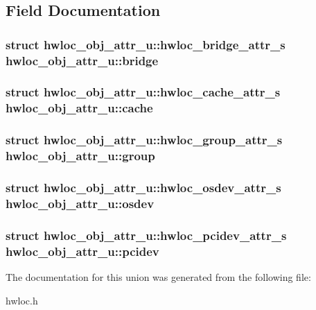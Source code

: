 \subsection{Field Documentation}
\hypertarget{a00017_adbdf280699dd84c7619cd8d9edc0d958}{
\subsubsection[{bridge}]{\setlength{\rightskip}{0pt plus 5cm}struct {\bf hwloc\_\-obj\_\-attr\_\-u::hwloc\_\-bridge\_\-attr\_\-s}  {\bf hwloc\_\-obj\_\-attr\_\-u::bridge}}}
\label{a00017_adbdf280699dd84c7619cd8d9edc0d958}
\hypertarget{a00017_ab5a8ae3bf490e6b1071fea53f7382836}{
\subsubsection[{cache}]{\setlength{\rightskip}{0pt plus 5cm}struct {\bf hwloc\_\-obj\_\-attr\_\-u::hwloc\_\-cache\_\-attr\_\-s}  {\bf hwloc\_\-obj\_\-attr\_\-u::cache}}}
\label{a00017_ab5a8ae3bf490e6b1071fea53f7382836}
\hypertarget{a00017_ae4ba157cc313e2cdd9a82f1c1df7aaa6}{
\subsubsection[{group}]{\setlength{\rightskip}{0pt plus 5cm}struct {\bf hwloc\_\-obj\_\-attr\_\-u::hwloc\_\-group\_\-attr\_\-s}  {\bf hwloc\_\-obj\_\-attr\_\-u::group}}}
\label{a00017_ae4ba157cc313e2cdd9a82f1c1df7aaa6}
\hypertarget{a00017_a22904c25fe44b323bab5c9bc52660fca}{
\subsubsection[{osdev}]{\setlength{\rightskip}{0pt plus 5cm}struct {\bf hwloc\_\-obj\_\-attr\_\-u::hwloc\_\-osdev\_\-attr\_\-s}  {\bf hwloc\_\-obj\_\-attr\_\-u::osdev}}}
\label{a00017_a22904c25fe44b323bab5c9bc52660fca}
\hypertarget{a00017_a4203d713ce0f5beaa6ee0e9bdac70828}{
\subsubsection[{pcidev}]{\setlength{\rightskip}{0pt plus 5cm}struct {\bf hwloc\_\-obj\_\-attr\_\-u::hwloc\_\-pcidev\_\-attr\_\-s}  {\bf hwloc\_\-obj\_\-attr\_\-u::pcidev}}}
\label{a00017_a4203d713ce0f5beaa6ee0e9bdac70828}


The documentation for this union was generated from the following file:\begin{DoxyCompactItemize}
\item 
hwloc.h\end{DoxyCompactItemize}
